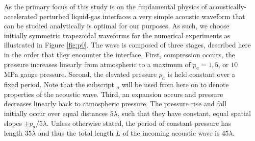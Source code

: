 As the primary focus of this study is on the fundamental physics of
acoustically-accelerated perturbed liquid-gas interfaces a very simple
acoustic waveform that can be studied analytically is optimal for our
purposes. As such, we choose initially symmetric trapezoidal waveforms
for the numerical experiments as illustrated in Figure
\ref{fig:p0}. The wave is composed of three stages, described here in
the order that they encounter the interface. First, compression
occurs, the pressure increases linearly from atmospheric to a maximum
of $p_a=1, 5$, or $10$ MPa gauge pressure. Second, the elevated
pressure $p_a$ is held constant over a fixed period. Note
that the subscript $_a$ will be used from here on to denote properties
of the acoustic wave. Third, an expansion occurs and pressure
decreases linearly back to atmospheric pressure. The pressure rise and
fall initially occur over equal distances $5\lambda$, such that they
have constant, equal spatial slopes $\pm p_{a}/5\lambda$. Unless
otherwise stated, the period of constant pressure has length
$35\lambda$ and thus the total length $L$ of the incoming acoustic wave is
$45\lambda$.
% 

